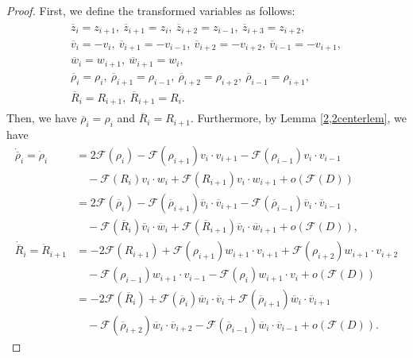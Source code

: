 \documentclass[10pt,a4paper]{amsart}
\numberwithin{equation}{section}
\begin{document}
\begin{proof}
First, we define the transformed variables as follows:
\begin{align}\label{kaitenhanten}
\begin{aligned}
\overline{z}_i=z_{i+1},\ \overline{z}_{i+1}=z_i,\ \overline{z}_{i+2}=z_{i-1},\ \overline{z}_{i+3}=z_{i+2},
\\
\overline{v}_i=-v_i,\ \overline{v}_{i+1}=-v_{i-1},\ \overline{v}_{i+2}=-v_{i+2},\ \overline{v}_{i-1}=-v_{i+1},
\\
\overline{w}_i=w_{i+1},\ \overline{w}_{i+1}=w_i,
\\
\overline{\rho}_i=\rho_i,\ \overline{\rho}_{i+1}=\rho_{i-1},\ \overline{\rho}_{i+2}=\rho_{i+2},\ \overline{\rho}_{i-1}=\rho_{i+1},\\ 
\overline{R}_i=R_{i+1},\ \overline{R}_{i+1}=R_i.
\end{aligned}
\end{align}
Then, we have $\overline{\rho}_i=\rho_i$ and $\overline{R}_i=R_{i+1}$. Furthermore, by Lemma \ref{2,2centerlem}, we have
\begin{align*}
\dot{\overline{\rho}}_i=\dot{\rho}_i&=2\mathcal{F}(\rho_i)-\mathcal{F}(\rho_{i+1})v_i\cdot v_{i+1}-\mathcal{F}(\rho_{i-1})v_i\cdot v_{i-1}
\\
&\quad-\mathcal{F}(R_i)v_i\cdot w_i+\mathcal{F}(R_{i+1})v_i\cdot w_{i+1}+o\left(\mathcal{F}(D)\right)
\\
&=2\mathcal{F}(\overline{\rho}_i)-\mathcal{F}(\overline{\rho}_{i+1})\overline{v}_i\cdot \overline{v}_{i+1}-\mathcal{F}(\overline{\rho}_{i-1})\overline{v}_i\cdot \overline{v}_{i-1}
\\
&\quad-\mathcal{F}(\overline{R}_i)\overline{v}_i\cdot \overline{w}_i+\mathcal{F}(\overline{R}_{i+1})\overline{v}_i\cdot \overline{w}_{i+1}+o\left(\mathcal{F}(D)\right),
\\
\dot{\overline{R}}_i=\dot{R}_{i+1}&=-2\mathcal{F}(R_{i+1})+\mathcal{F}(\rho_{i+1})w_{i+1}\cdot v_{i+1}+\mathcal{F}(\rho_{i+2})w_{i+1}\cdot v_{i+2}
\\
&\quad -\mathcal{F}(\rho_{i-1})w_{i+1}\cdot v_{i-1}-\mathcal{F}(\rho_{i})w_{i+1}\cdot v_i+o\left(\mathcal{F}(D)\right)
\\
&=-2\mathcal{F}(\overline{R}_i)+\mathcal{F}(\overline{\rho}_i)\overline{w}_i\cdot \overline{v}_i+\mathcal{F}(\overline{\rho}_{i+1})\overline{w}_i\cdot \overline{v}_{i+1}
\\
&\quad-\mathcal{F}(\overline{\rho}_{i+2})\overline{w}_i\cdot \overline{v}_{i+2}-\mathcal{F}(\overline{\rho}_{i-1})\overline{w}_i\cdot \overline{v}_{i-1}+o\left(\mathcal{F}(D)\right).
\end{align*}

\end{proof}
\end{document}

